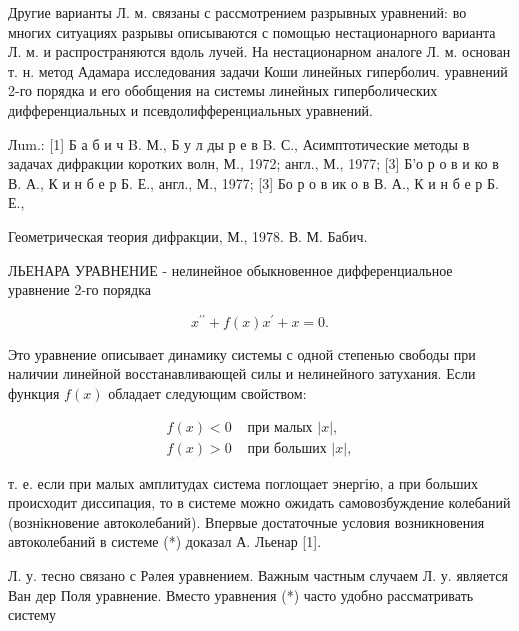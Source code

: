 \documentclass[10pt]{article}
\begin{document}
Другие варианты Л. м. связаны с рассмотрением разрывных уравнений: во многих ситуациях разрывы описываются с помощью нестационарного варианта Л. м. и распространяются вдоль лучей. На нестационарном аналоге Л. м. основан т. н. метод Адамара исследования задачи Коши линейных гиперболич. уравнений 2-го порядка и его обобщения на системы линейных гиперболических дифференциальных и псевдолифференциальных уравнений.



Лum.: [1] Б а б и ч B. М., Б у л ды р е в B. С., Асимптотические методы в задачах дифракции коротких волн, М., 1972; англ., М., 1977; [3] Б'о р о в и ко в В. А., К и н б е р Б. Е., англ., М., 1977; [3] Бо р о в ик о в В. А., К и н б е р Б. Е.,

Геометрическая теория дифракции, М., 1978. В. М. Бабич.



ЛЬЕНАРА УРАВНЕНИЕ - нелинейное обыкновенное дифференциальное уравнение 2-го порядка



\[

x^{\prime \prime}+f(x) x^{\prime}+x=0 .

\]



Это уравнение описывает динамику системы с одной степенью свободы при наличии линейной восстанавливающей силы и нелинейного затухания. Если функция $f(x)$ обладает следующим свойством:



\[

\begin{array}{ll}

f(x)<0 & \text { при малых }|x|, \\

f(x)>0 & \text { при больших }|x|,

\end{array}

\]



т. е. если при малых амплитудах система поглощает энергію, а при больших происходит диссипация, то в системе можно ожидать самовозбуждение колебаний (вознікновение автоколебаний). Впервые достаточные условия возникновения автоколебаний в системе (*) доказал А. Льенар [1].



Л. у. тесно связано с Рәлея уравнением. Важным частным случаем Л. у. является Ван дер Поля уравнение. Вместо уравнения (*) часто удобно рассматривать систему
\end{document}
